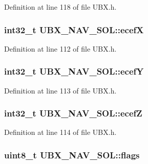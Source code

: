 \-Definition at line 118 of file \-U\-B\-X.\-h.

\hypertarget{struct_u_b_x___n_a_v___s_o_l_a9c671f98502c60d7997cccc3460e8879}{
\subsubsection[{ecef\-X}]{\setlength{\rightskip}{0pt plus 5cm}int32\-\_\-t {\bf \-U\-B\-X\-\_\-\-N\-A\-V\-\_\-\-S\-O\-L\-::ecef\-X}}}\label{struct_u_b_x___n_a_v___s_o_l_a9c671f98502c60d7997cccc3460e8879}


\-Definition at line 112 of file \-U\-B\-X.\-h.

\hypertarget{struct_u_b_x___n_a_v___s_o_l_aec3dced166e4dcaa0826b1e851532604}{
\subsubsection[{ecef\-Y}]{\setlength{\rightskip}{0pt plus 5cm}int32\-\_\-t {\bf \-U\-B\-X\-\_\-\-N\-A\-V\-\_\-\-S\-O\-L\-::ecef\-Y}}}\label{struct_u_b_x___n_a_v___s_o_l_aec3dced166e4dcaa0826b1e851532604}


\-Definition at line 113 of file \-U\-B\-X.\-h.

\hypertarget{struct_u_b_x___n_a_v___s_o_l_af7e4df25c5986355c90a1a519b39b50d}{
\subsubsection[{ecef\-Z}]{\setlength{\rightskip}{0pt plus 5cm}int32\-\_\-t {\bf \-U\-B\-X\-\_\-\-N\-A\-V\-\_\-\-S\-O\-L\-::ecef\-Z}}}\label{struct_u_b_x___n_a_v___s_o_l_af7e4df25c5986355c90a1a519b39b50d}


\-Definition at line 114 of file \-U\-B\-X.\-h.

\hypertarget{struct_u_b_x___n_a_v___s_o_l_a25c7a16be058569db8ae95b89abf3b42}{
\subsubsection[{flags}]{\setlength{\rightskip}{0pt plus 5cm}uint8\-\_\-t {\bf \-U\-B\-X\-\_\-\-N\-A\-V\-\_\-\-S\-O\-L\-::flags}}}\label{struct_u_b_x___n_a_v___s_o_l_a25c7a16be058569db8ae95b89abf3b42}


